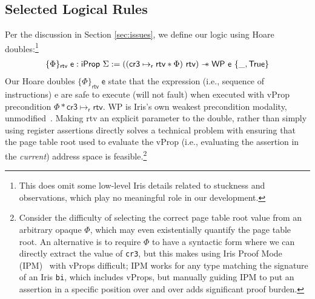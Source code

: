 \subsection{Selected Logical Rules}
\label{sec:selected_rules}
Per the discussion in Section \ref{sec:issues}, we define our logic using Hoare doubles:\footnote{This does
omit some low-level Iris details related to stuckness and observations, which play no meaningful
role in our development.}
  \[
  \begin{array}{l}
    \{ \Phi \}_\mathsf{ rtv }\;\textsf{e} : \textsf{iProp }\Sigma := 
   ((\textsf{cr3} \mapsto_{\textsf{r}} \textsf{rtv} \ast \Phi) \textsf{ rtv}) \mathrel{-\!\!\ast} \textsf{WP e } \{\_, \textsf{True} \}
    \end{array}
  \]
Our Hoare doubles $\{\Phi\}_\textsf{rtv}\;\textsf{e}$ state that the expression (i.e., sequence of instructions)
\textsf{e} are safe to execute (will not fault)
when executed with \textsf{vProp} precondition $\Phi\ast\textsf{cr3}\mapsto_{\textsf{r}} \textsf{rtv}$.
\textsf{WP} is Iris's own weakest precondition modality, unmodified~\cite{jung2018iris}.
Making \textsf{rtv} an explicit parameter to the double, rather than simply using register assertions
directly solves a technical problem with ensuring that the page table root used to evaluate
the \textsf{vProp} (i.e., evaluating the assertion in the \emph{current}) address space
is feasible.\footnote{Consider the difficulty of selecting the correct page table root value from an arbitrary
opaque $\Phi$, which may even existentially quantify the page table root. An alternative is to
require $\Phi$ to have a syntactic form where we can directly extract the value of \lstinline|cr3|,
but this makes using Iris Proof Mode (IPM)~\cite{Krebbers:2017:IPH:3009837.3009855} with \textsf{vProps}
  difficult; IPM works for any type matching the signature of an Iris \lstinline|bi|, which includes
  \textsf{vProp}s, but manually guiding IPM to put an assertion in a specific position over and over adds
  significant proof burden.
}

